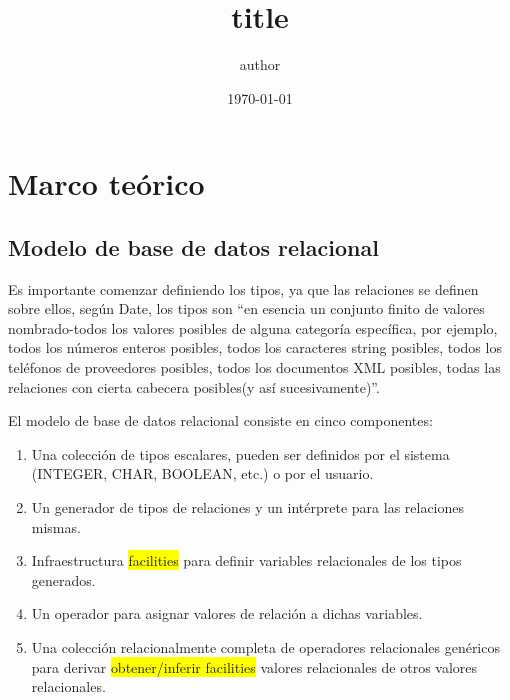 \documentclass[12pt,letterpaper]{article}
\author{author}
\title{title}
\date{\today}
\begin{document}
\maketitle	
\pagebreak
\tableofcontents
\pagebreak
\section {Marco teórico}
\subsection {Modelo de base de datos relacional}
Es importante comenzar definiendo los tipos, ya que las relaciones se definen sobre ellos, según Date, los tipos son ``en esencia un conjunto finito de valores nombrado-todos los valores posibles de alguna categoría específica, por ejemplo, todos los números enteros posibles, todos los caracteres string posibles, todos los teléfonos de proveedores posibles, todos los documentos XML posibles, todas las relaciones con cierta cabecera posibles(y así sucesivamente)''. 

El modelo de base de datos relacional consiste en cinco componentes:
\begin{enumerate}
    \item Una colección de tipos escalares, pueden ser definidos por el sistema (INTEGER, CHAR, BOOLEAN, etc.) o por el usuario.
    \item Un generador de tipos de relaciones y un intérprete para las relaciones mismas.
    \item Infraestructura \colorbox{yellow}{facilities} para definir variables relacionales de los tipos generados.
    \item Un operador para asignar valores de relación a dichas variables.
    \item Una colección relacionalmente completa de operadores relacionales genéricos para derivar \colorbox{yellow}{obtener/inferir facilities} valores relacionales de otros valores relacionales.
\end{enumerate}
\end{document}
